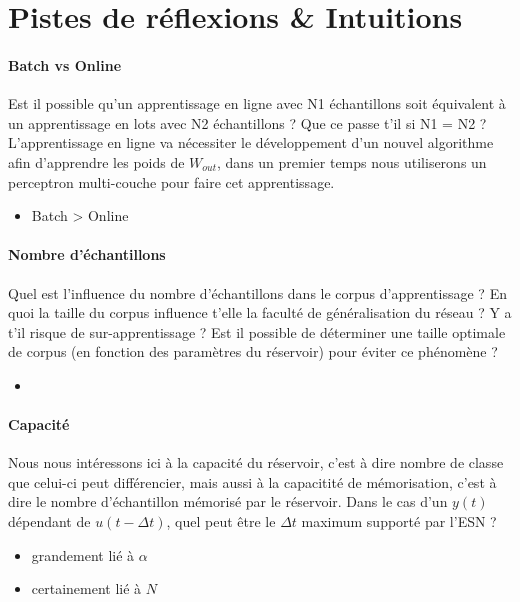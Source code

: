 \documentclass[12pt]{article}
\begin{document}
\section{Pistes de réflexions \& Intuitions}

\paragraph{Batch vs Online}
Est il possible qu'un apprentissage en ligne avec N1 échantillons soit équivalent à un apprentissage en lots avec N2 échantillons ? Que ce passe t'il si N1 = N2 ? L'apprentissage en ligne va nécessiter le développement d'un nouvel algorithme afin d'apprendre les poids de $W_{out}$, dans un premier temps nous utiliserons un perceptron multi-couche pour faire cet apprentissage.

\begin{itemize}
\item Batch > Online
\end{itemize}

\paragraph{Nombre d'échantillons}
Quel est l'influence du nombre d'échantillons dans le corpus d'apprentissage ? En quoi la taille du corpus influence t'elle la faculté de généralisation du réseau ? Y a t'il risque de sur-apprentissage ? Est il possible de déterminer une taille optimale de corpus (en fonction des paramètres du réservoir) pour éviter ce phénomène ?

\begin{itemize}
\item 
\end{itemize}

\paragraph{Capacité}
Nous nous intéressons ici à la capacité du réservoir, c'est à dire nombre de classe que celui-ci peut différencier, mais aussi à la capacitité de mémorisation, c'est à dire le nombre d'échantillon mémorisé par le réservoir. Dans le cas d'un $y(t)$ dépendant de $u(t-\Delta t)$, quel peut être le $\Delta t$ maximum supporté par l'ESN ?

\begin{itemize}
\item grandement lié à $\alpha$
\item certainement lié à $N$
\end{itemize}
\end{document}
